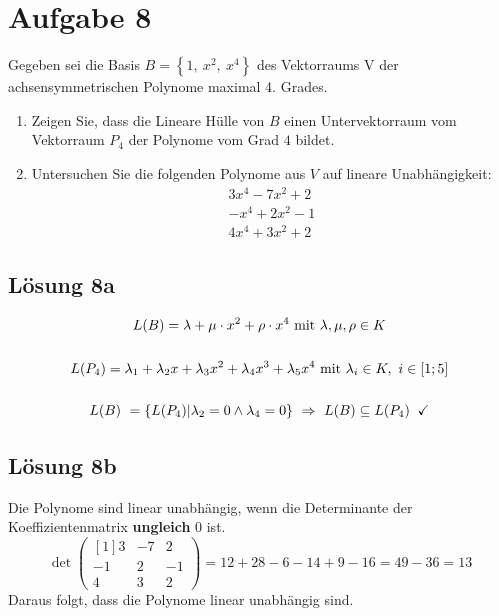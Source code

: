 \documentclass[main.tex]{subfiles}
\begin{document}
\section{Aufgabe 8}
Gegeben sei die Basis $B=\left\{1,\ x^{2} ,\ x^{4}\right\}$ des Vektorraums V der achsensymmetrischen Polynome maximal 4. Grades. 

\begin{enumerate}
    \item Zeigen Sie, dass die Lineare Hülle von $B$ einen Untervektorraum vom Vektorraum $P_{4}$ der Polynome vom Grad $4$ bildet.
    \item Untersuchen Sie die folgenden Polynome aus $V$ auf lineare Unabhängigkeit:
    \begin{gather*}
        3x^{4} -7x^{2} +2\\
        -x^{4} +2x^{2} -1\\
        4x^{4} +3x^{2} +2
    \end{gather*}    
\end{enumerate}

\subsection{Lösung 8a}

\begin{gather*}
    L( B) =\lambda +\mu \cdotp x^{2} +\rho \cdotp x^{4} \ \text{mit} \ \lambda ,\mu ,\rho \in K\\
    \\
    L( P_{4}) =\lambda _{1} +\lambda _{2} x+\lambda _{3} x^{2} +\lambda _{4} x^{3} +\lambda _{5} x^{4} \ \text{mit} \ \lambda _{i} \in K,\ i\in [ 1;5]\\
    \\
    L( B) \ =\{L( P_{4}) | \lambda _{2} =0\land \lambda _{4} =0\} \ \Rightarrow \ L( B) \subseteq L( P_{4}) \;\; \checked 
\end{gather*}    
        
\subsection{Lösung 8b}

Die Polynome sind linear unabhängig, wenn die Determinante der Koeffizientenmatrix \textbf{ungleich} $0$ ist.
\begin{equation*}
    \det\begin{pmatrix}[1]
    3 & -7 & 2\\
    -1 & 2 & -1\\
    4 & 3 & 2
    \end{pmatrix} = 12+28-6-14+9-16 = 49-36 = 13
\end{equation*}
Daraus folgt, dass die Polynome linear unabhängig sind.
\end{document}
